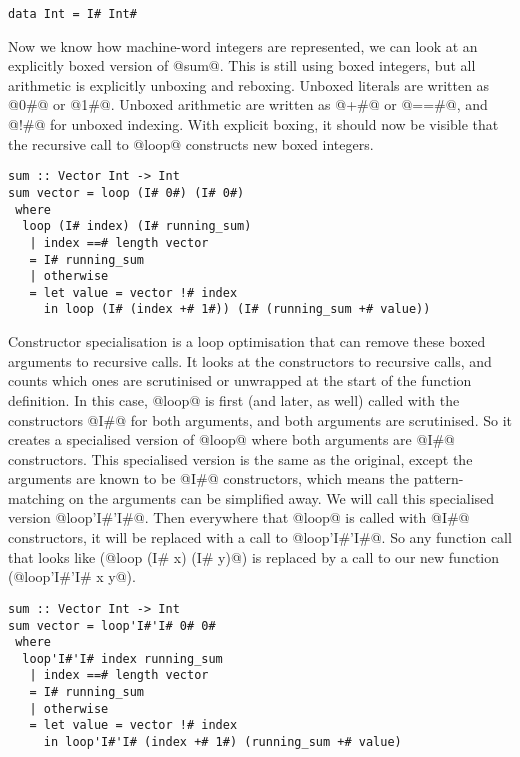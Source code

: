 \begin{lstlisting}
data Int = I# Int#
\end{lstlisting}

Now we know how machine-word integers are represented, we can look at an explicitly boxed version of @sum@.
This is still using boxed integers, but all arithmetic is explicitly unboxing and reboxing.
Unboxed literals are written as @0#@ or @1#@.
Unboxed arithmetic are written as @+#@ or @==#@, and @!#@ for unboxed indexing.
With explicit boxing, it should now be visible that the recursive call to @loop@ constructs new boxed integers.

\begin{lstlisting}
sum :: Vector Int -> Int
sum vector = loop (I# 0#) (I# 0#)
 where
  loop (I# index) (I# running_sum)
   | index ==# length vector
   = I# running_sum
   | otherwise
   = let value = vector !# index
     in loop (I# (index +# 1#)) (I# (running_sum +# value))
\end{lstlisting}

Constructor specialisation \cite{peyton2007call} is a loop optimisation that can remove these boxed arguments to recursive calls.
It looks at the constructors to recursive calls, and counts which ones are scrutinised or unwrapped at the start of the function definition.
In this case, @loop@ is first (and later, as well) called with the constructors @I#@ for both arguments, and both arguments are scrutinised.
So it creates a specialised version of @loop@ where both arguments are @I#@ constructors.
This specialised version is the same as the original, except the arguments are known to be @I#@ constructors, which means the pattern-matching on the arguments can be simplified away.
We will call this specialised version @loop'I#'I#@.
Then everywhere that @loop@ is called with @I#@ constructors, it will be replaced with a call to @loop'I#'I#@.
So any function call that looks like (@loop (I# x) (I# y)@) is replaced by a call to our new function (@loop'I#'I# x y@).

\begin{lstlisting}
sum :: Vector Int -> Int
sum vector = loop'I#'I# 0# 0#
 where
  loop'I#'I# index running_sum
   | index ==# length vector
   = I# running_sum
   | otherwise
   = let value = vector !# index
     in loop'I#'I# (index +# 1#) (running_sum +# value)
\end{lstlisting}

